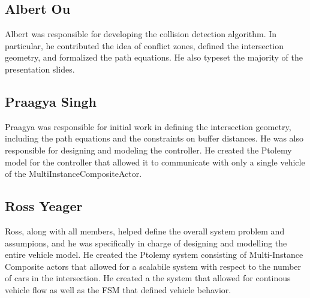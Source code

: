 \subsection{Albert Ou}

Albert was responsible for developing the collision detection algorithm.
In particular, he contributed the idea of conflict zones, defined the
intersection geometry, and formalized the path equations.
He also typeset the majority of the presentation slides.

\subsection{Praagya Singh}

Praagya was responsible for initial work in defining the intersection
geometry, including the path equations and the constraints on buffer
distances.  He was also responsible for designing and modeling the
controller.  He created the Ptolemy model for the controller that allowed it
to communicate with only a single vehicle of the MultiInstanceCompositeActor.

\subsection{Ross Yeager}

Ross, along with all members, helped define the overall system problem and assumpions, and he was specifically in charge of designing and modelling the entire vehicle model.  
He created the Ptolemy system consisting of Multi-Instance Composite actors that allowed for a scalabile system with respect to the number of cars in the intersection.  
He created a the system that allowed for continous vehicle flow as well as the FSM that defined vehicle behavior.

